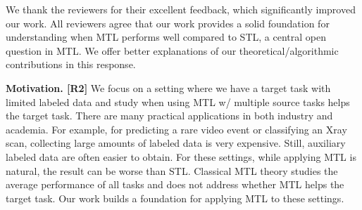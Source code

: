 \documentclass{article}
\begin{document}
We thank the reviewers for their excellent feedback, which significantly improved our work.
All reviewers agree that our work provides a solid foundation for understanding when MTL performs well compared to STL, a central open question in MTL.
We offer better explanations of our theoretical/algorithmic contributions in this response.


\textbf{Motivation. [R2]}
We focus on a setting where we have a target task with limited labeled data and study when using MTL w/ multiple source tasks helps the target task. %
There are many practical applications in both industry and academia.
For example, for predicting a rare video event or classifying an Xray scan, collecting large amounts of labeled data is very expensive.
Still, auxiliary labeled data are often easier to obtain.
For these settings, while applying MTL is natural, the result can be worse than STL.
Classical MTL theory studies the average performance of all tasks and does not address whether MTL helps the target task.
Our work builds a foundation for applying MTL to these settings.
\end{document}

